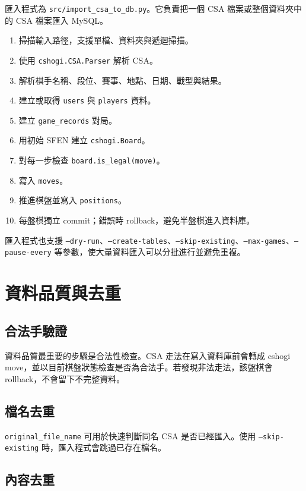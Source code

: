 \documentclass[12pt,a4paper,fontset=none]{ctexart}
\begin{document}
匯入程式為 \texttt{src/import\_csa\_to\_db.py}。它負責把一個 CSA 檔案或整個資料夾中的 CSA 檔案匯入 MySQL。

\begin{enumerate}
  \item 掃描輸入路徑，支援單檔、資料夾與遞迴掃描。
  \item 使用 \texttt{cshogi.CSA.Parser} 解析 CSA。
  \item 解析棋手名稱、段位、賽事、地點、日期、戰型與結果。
  \item 建立或取得 \texttt{users} 與 \texttt{players} 資料。
  \item 建立 \texttt{game\_records} 對局。
  \item 用初始 SFEN 建立 \texttt{cshogi.Board}。
  \item 對每一步檢查 \texttt{board.is\_legal(move)}。
  \item 寫入 \texttt{moves}。
  \item 推進棋盤並寫入 \texttt{positions}。
  \item 每盤棋獨立 commit；錯誤時 rollback，避免半盤棋進入資料庫。
\end{enumerate}

匯入程式也支援 \texttt{--dry-run}、\texttt{--create-tables}、\texttt{--skip-existing}、\texttt{--max-games}、\texttt{--pause-every} 等參數，使大量資料匯入可以分批進行並避免重複。

\section{資料品質與去重}

\subsection{合法手驗證}

資料品質最重要的步驟是合法性檢查。CSA 走法在寫入資料庫前會轉成 cshogi move，並以目前棋盤狀態檢查是否為合法手。若發現非法走法，該盤棋會 rollback，不會留下不完整資料。

\subsection{檔名去重}

\texttt{original\_file\_name} 可用於快速判斷同名 CSA 是否已經匯入。使用 \texttt{--skip-existing} 時，匯入程式會跳過已存在檔名。

\subsection{內容去重}
\end{document}
